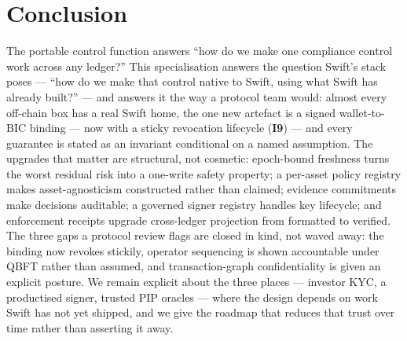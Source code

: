 \documentclass[11pt,a4paper]{article}
\newcommand{\Iref}[1]{\textbf{I#1}}
\begin{document}
\section{Conclusion}
\label{sec:concl}

The portable control function answers ``how do we make one compliance control
work across any ledger?'' This specialisation answers the question Swift's stack
poses --- ``how do we make that control native to Swift, using what Swift has
already built?'' --- and answers it the way a protocol team would: almost every
off-chain box has a real Swift home, the one new artefact is a signed
wallet-to-BIC binding --- now with a sticky revocation lifecycle (\Iref{9}) ---
and every guarantee is stated as an invariant conditional on a named assumption.
The upgrades that matter are structural, not cosmetic: epoch-bound freshness turns
the worst residual risk into a one-write safety property; a per-asset policy
registry makes asset-agnosticism constructed rather than claimed; evidence
commitments make decisions auditable; a governed signer registry handles key
lifecycle; and enforcement receipts upgrade cross-ledger projection from formatted
to verified. The three gaps a protocol review flags are closed in kind, not waved
away: the binding now revokes stickily, operator sequencing is shown accountable
under QBFT rather than assumed, and transaction-graph confidentiality is given an
explicit posture. We remain explicit about the three places --- investor KYC, a
productised signer, trusted PIP oracles --- where the design depends on work Swift
has not yet shipped, and we give the roadmap that reduces that trust over time
rather than asserting it away.
\end{document}
